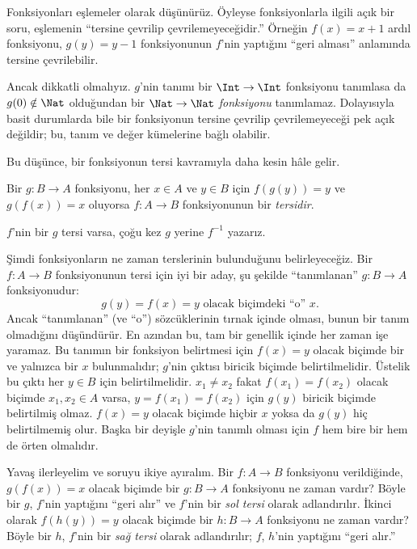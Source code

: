 


\begin{explain}
Fonksiyonları eşlemeler olarak düşünürüz. Öyleyse fonksiyonlarla ilgili açık
bir soru, eşlemenin ``tersine çevrilip çevrilemeyeceğidir.'' Örneğin
$f(x)=x+1$ ardıl fonksiyonu, $g(y)=y-1$ fonksiyonunun $f$'nin yaptığını
``geri alması'' anlamında tersine çevrilebilir.

Ancak dikkatli olmalıyız. $g$'nin tanımı bir $\Int \to \Int$ fonksiyonu
tanımlasa da $g(0)\notin\Nat$ olduğundan bir \emph{$\Nat \to \Nat$
fonksiyonu} tanımlamaz. Dolayısıyla basit durumlarda bile bir fonksiyonun
tersine çevrilip çevrilemeyeceği pek açık değildir; bu, tanım ve değer
kümelerine bağlı olabilir.

Bu düşünce, bir fonksiyonun tersi kavramıyla daha kesin hâle gelir.
\end{explain}

\begin{defn}
Bir $g \colon B \to A$ fonksiyonu, her $x \in A$ ve $y \in B$ için
$f(g(y))=y$ ve $g(f(x))=x$ oluyorsa $f \colon A \to B$ fonksiyonunun bir
\emph{tersidir}.
\end{defn}

$f$'nin bir $g$ tersi varsa, çoğu kez $g$ yerine $f^{-1}$ yazarız.

\begin{explain}
Şimdi fonksiyonların ne zaman terslerinin bulunduğunu belirleyeceğiz. Bir
$f\colon A \to B$ fonksiyonunun tersi için iyi bir aday, şu şekilde
``tanımlanan'' $g\colon B \to A$ fonksiyonudur:
\[
g(y) = \text{$f(x)=y$ olacak biçimdeki ``o'' $x$.}
\]
Ancak ``tanımlanan'' (ve ``o'') sözcüklerinin tırnak içinde olması, bunun bir
tanım olmadığını düşündürür. En azından bu, tam bir genellik içinde her zaman
işe yaramaz. Bu tanımın bir fonksiyon belirtmesi için $f(x)=y$ olacak biçimde
bir ve yalnızca bir $x$ bulunmalıdır; $g$'nin çıktısı biricik biçimde
belirtilmelidir. Üstelik bu çıktı her $y \in B$ için belirtilmelidir.
$x_1\neq x_2$ fakat $f(x_1)=f(x_2)$ olacak biçimde $x_1,x_2\in A$ varsa,
$y=f(x_1)=f(x_2)$ için $g(y)$ biricik biçimde belirtilmiş olmaz. $f(x)=y$
olacak biçimde hiçbir $x$ yoksa da $g(y)$ hiç belirtilmemiş olur. Başka bir
deyişle $g$'nin tanımlı olması için $f$ hem bire bir hem de örten olmalıdır.

Yavaş ilerleyelim ve soruyu ikiye ayıralım. Bir $f\colon A \to B$ fonksiyonu
verildiğinde, $g(f(x))=x$ olacak biçimde bir $g\colon B \to A$ fonksiyonu ne
zaman vardır? Böyle bir $g$, $f$'nin yaptığını ``geri alır'' ve $f$'nin bir
\emph{sol tersi} olarak adlandırılır. İkinci olarak $f(h(y))=y$ olacak biçimde
bir $h\colon B \to A$ fonksiyonu ne zaman vardır? Böyle bir $h$, $f$'nin bir
\emph{sağ tersi} olarak adlandırılır; $f$, $h$'nin yaptığını ``geri alır.''
\end{explain}

